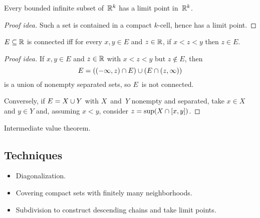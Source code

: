 \begin{cor}
Every bounded infinite subset of~\(\mathbb{R}^k\) has a limit point in~\(\mathbb{R}^k\).
\end{cor}
\begin{proof}[Proof idea]
Such a set is contained in a compact \(k\)-cell, hence has a limit point.
\end{proof}

\begin{thm}[Connectedness in~\(\R\)]
\(E\subseteq\mathbb{R}\) is connected iff for every \(x,y\in E\) and \(z\in\mathbb{R}\), if \(x<z<y\) then \(z\in E\).
\end{thm}
\begin{proof}[Proof idea]
If \(x,y\in E\) and \(z\in\mathbb{R}\) with \(x<z<y\) but \(z\not\in E\), then
\[E=((-\infty,z)\cap E)\cup(E\cap(z,\infty))\]
is a union of nonempty separated sets, so \(E\)~is not connected.

Conversely, if \(E=X\cup Y\) with \(X\)~and~\(Y\) nonempty and separated, take \(x\in X\) and \(y\in Y\) and, assuming \(x<y\), consider \(z=\sup(X\cap[x,y])\).
\end{proof}
\begin{app}
Intermediate value theorem.
\end{app}
\subsection*{Techniques}
\begin{itemize}[itemsep=0pt]
\item Diagonalization.
\item Covering compact sets with finitely many neighborhoods.
\item Subdivision to construct descending chains and take limit points.
\end{itemize}
